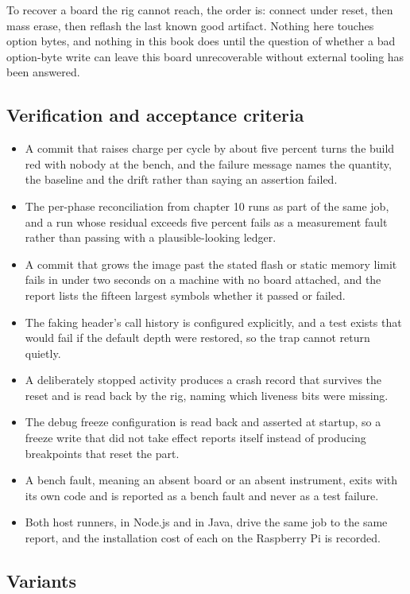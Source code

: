 To recover a board the rig cannot reach, the order is: connect under reset,
then mass erase, then reflash the last known good artifact. Nothing here touches
option bytes, and nothing in this book does until the question of whether a bad
option-byte write can leave this board unrecoverable without external tooling
has been answered.

\subsection*{Verification and acceptance criteria}

\begin{itemize}
\item A commit that raises charge per cycle by about five percent turns the
build red with nobody at the bench, and the failure message names the quantity,
the baseline and the drift rather than saying an assertion failed.
\item The per-phase reconciliation from chapter 10 runs as part of the same job,
and a run whose residual exceeds five percent fails as a measurement fault
rather than passing with a plausible-looking ledger.
\item A commit that grows the image past the stated flash or static memory limit
fails in under two seconds on a machine with no board attached, and the report
lists the fifteen largest symbols whether it passed or failed.
\item The faking header's call history is configured explicitly, and a test
exists that would fail if the default depth were restored, so the trap cannot
return quietly.
\item A deliberately stopped activity produces a crash record that survives the
reset and is read back by the rig, naming which liveness bits were missing.
\item The debug freeze configuration is read back and asserted at startup, so a
freeze write that did not take effect reports itself instead of producing
breakpoints that reset the part.
\item A bench fault, meaning an absent board or an absent instrument, exits with
its own code and is reported as a bench fault and never as a test failure.
\item Both host runners, in Node.js and in Java, drive the same job to the same
report, and the installation cost of each on the Raspberry Pi is recorded.
\end{itemize}

\subsection*{Variants}

